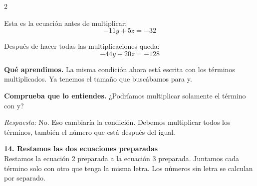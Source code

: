 \documentclass[11pt,a4paper,landscape]{article}
\begin{document}
\begin{multicols*}{2}
\begin{minipage}{\linewidth}
\par\smallskip Esta es la ecuación antes de multiplicar:
\[-11y + 5z = -32\]
\par{}\par\smallskip
\par\smallskip Después de hacer todas las multiplicaciones queda:
\[-44y + 20z = -128\]
\par\smallskip\textbf{Qué aprendimos.} La misma condición ahora está escrita con los términos multiplicados. Ya tenemos el tamaño que buscábamos para y.
\par\smallskip\textbf{Comprueba que lo entiendes.} ¿Podríamos multiplicar solamente el término con y?\par\textit{Respuesta:} No. Eso cambiaría la condición. Debemos multiplicar todos los términos, también el número que está después del igual.
\end{minipage}\par\medskip
\noindent\begin{minipage}{\linewidth}\textbf{14. Restamos las dos ecuaciones preparadas}\\[2pt]Restamos la ecuación 2 preparada a la ecuación 3 preparada. Juntamos cada término solo con otro que tenga la misma letra. Los números sin letra se calculan por separado.
\par{}\par\smallskip

\end{minipage}
\end{multicols*}
\end{document}
